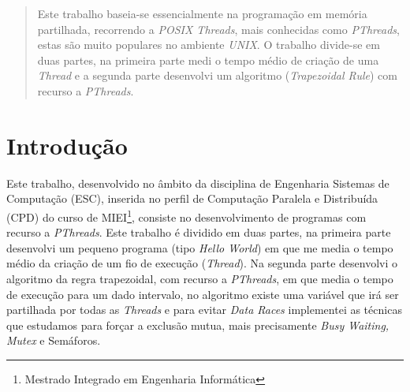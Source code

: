 \documentclass[conference,compsoc]{IEEEtran}
\begin{document}
\maketitle

\tableofcontents
\vspace{0.5cm}

\begin{abstract}
Este trabalho baseia-se essencialmente na programação em memória partilhada, recorrendo a \textit{POSIX Threads}, mais conhecidas como \textit{PThreads}, estas são muito populares no ambiente \textit{UNIX}. O trabalho divide-se em duas partes, na primeira parte medi o tempo médio de criação de uma \textit{Thread} e a segunda parte desenvolvi um algoritmo (\textit{Trapezoidal Rule}) com recurso a \textit{PThreads}. 
\end{abstract}





%
\IEEEpeerreviewmaketitle



\section{Introdução}
Este trabalho, desenvolvido no âmbito da disciplina de Engenharia Sistemas de Computação (ESC), inserida no perfil de Computação Paralela e Distribuída (CPD) do curso de MIEI\footnote{Mestrado Integrado em Engenharia Informática}, consiste no desenvolvimento de programas com recurso a \textit{PThreads}. Este trabalho é dividido em duas partes, na primeira parte desenvolvi um pequeno programa (tipo \textit{Hello World}) em que me media o tempo médio da criação de um fio de execução (\textit{Thread}). Na segunda parte desenvolvi o algoritmo da regra trapezoidal, com recurso a \textit{PThreads}, em que media o tempo de execução para um dado intervalo, no algoritmo existe uma variável que irá ser partilhada por todas as \textit{Threads} e para evitar \textit{Data Races} implementei as técnicas que estudamos para forçar a exclusão mutua, mais precisamente \textit{Busy Waiting, Mutex} e Semáforos.
\end{document}
